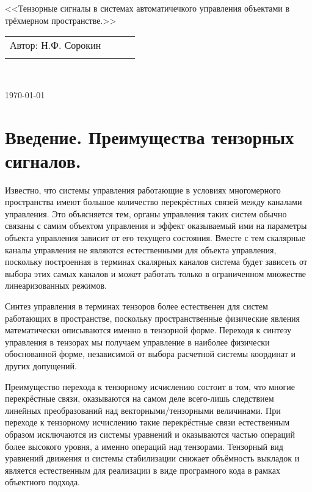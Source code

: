 \documentclass[a4paper]{article}
\begin{document}
\begin{center}
\hfill \break
\hfill\break
\hfill \break
\hfill \break
\hfill \break
\hfill \break
\hfill \break
\hfill \break
\hfill \break
\hfill \break
\large{<<Тензорные сигналы в системах автоматичечкого управления объектами в трёхмерном пространстве.>>}\\
\hfill \break
\hfill \break
\hfill \break
\hfill \break
\hfill \break
\hfill \break
\hfill \break
\hfill \break
\end{center}
 
\normalsize{ 
\begin{tabular}{lccl}
Автор: Н.Ф. Сорокин\\\\
\end{tabular}
}\\
\hfill \break
\hfill \break
\hfill \break
\hfill \break
\hfill \break
\begin{center} \today \end{center}
\thispagestyle{empty} %
\newpage

\section{Введение. Преимущества тензорных сигналов.}

Известно, что системы управления работающие в условиях многомерного пространства имеют большое количество перекрёстных связей между каналами управления. Это объясняется тем, органы управления таких систем обычно связаны с самим объектом управления и эффект оказываемый ими на параметры объекта управления зависит от его текущего состояния. Вместе с тем скалярные каналы управления не являются естественными для объекта управления, поскольку построенная в терминах скалярных каналов система будет зависеть от выбора этих самых каналов и может работать только в ограниченном множестве линеаризованных режимов. 

Синтез управления в терминах тензоров более естественен для систем работающих в пространстве, поскольку пространственные физические явления математически описываются именно в тензорной форме. Переходя к синтезу управления в тензорах мы получаем управление в наиболее физически обоснованной форме, независимой от выбора расчетной системы координат и других допущений. 

Преимущество перехода к тензорному исчислению состоит в том, что многие перекрёстные связи, оказываются на самом деле всего-лишь следствием линейных преобразований над векторными/тензорными величинами. При переходе к тензорному исчислению такие перекрёстные связи естественным образом исключаются из системы уравнений и оказываются частью операций более высокого уровня, а именно операций над тензорами. Тензорный вид уравнений движения и системы стабилизации снижает объёмность выкладок и является естественным для реализации в виде програмного кода в рамках объектного подхода. 
\end{document}
